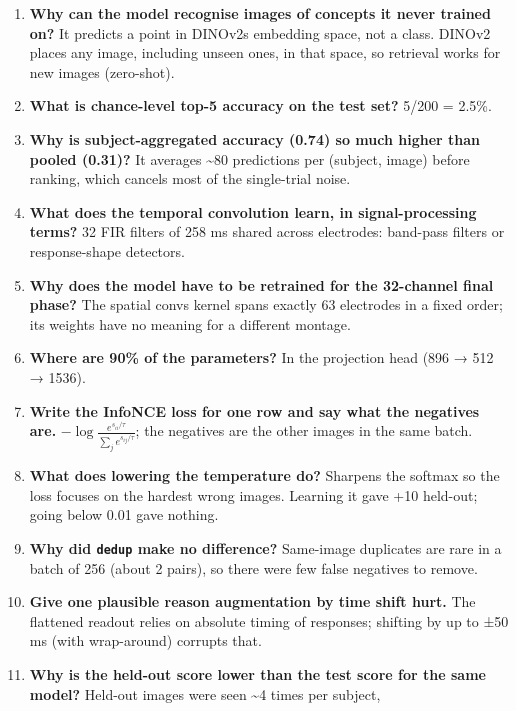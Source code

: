 \documentclass[
  11pt,
]{article}
\providecommand{\tightlist}{%
  \setlength{\itemsep}{0pt}\setlength{\parskip}{0pt}}
\renewcommand{\_}{\oldunderscore\allowbreak}
\begin{document}
\begin{enumerate}
\def\labelenumi{\arabic{enumi}.}
\tightlist
\item
  \textbf{Why can the model recognise
  images of concepts it never trained
  on?} It predicts a point in
  DINOv2\textquotesingle s embedding
  space, not a class. DINOv2 places any
  image, including unseen ones, in that
  space, so retrieval works for new
  images (zero-shot).
\item
  \textbf{What is chance-level top-5
  accuracy on the test set?} 5/200 =
  2.5\%.
\item
  \textbf{Why is subject-aggregated
  accuracy (0.74) so much higher than
  pooled (0.31)?} It averages
  \textasciitilde80 predictions per
  (subject, image) before ranking, which
  cancels most of the single-trial
  noise.
\item
  \textbf{What does the temporal
  convolution learn, in
  signal-processing terms?} 32 FIR
  filters of 258 ms shared across
  electrodes: band-pass filters or
  response-shape detectors.
\item
  \textbf{Why does the model have to be
  retrained for the 32-channel final
  phase?} The spatial
  conv\textquotesingle s kernel spans
  exactly 63 electrodes in a fixed
  order; its weights have no meaning for
  a different montage.
\item
  \textbf{Where are 90\% of the
  parameters?} In the projection head
  (896 → 512 → 1536).
\item
  \textbf{Write the InfoNCE loss for one
  row and say what the negatives are.}
  \(-\log \frac{e^{s_{ii}/\tau}}{\sum_j e^{s_{ij}/\tau}}\);
  the negatives are the other images in
  the same batch.
\item
  \textbf{What does lowering the
  temperature do?} Sharpens the softmax
  so the loss focuses on the hardest
  wrong images. Learning it gave +10
  held-out; going below 0.01 gave
  nothing.
\item
  \textbf{Why did \texttt{dedup} make no
  difference?} Same-image duplicates are
  rare in a batch of 256 (about 2
  pairs), so there were few false
  negatives to remove.
\item
  \textbf{Give one plausible reason
  augmentation by time shift hurt.} The
  flattened readout relies on absolute
  timing of responses; shifting by up to
  ±50 ms (with wrap-around) corrupts
  that.
\item
  \textbf{Why is the held-out score
  lower than the test score for the same
  model?} Held-out images were seen
  \textasciitilde4 times per subject,

\end{enumerate}
\end{document}
